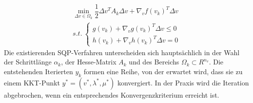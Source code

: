 \documentclass[12pt,a4paper]{article}
\begin{document}
  \begin{align*}
  \min_{\Delta v \in \Omega_{k}} \dfrac{1}{2} \Delta v^{T} A_{k} \Delta v + \nabla_{v} f(v_{k})^{T} \Delta v \\
  s.t. \ 
     \left\lbrace   \begin{array}{c} g(v_{k}) + \nabla_{v} g(v_{k})^{T} \Delta v \leq 0\\ h(v_{k}) + \nabla_{v} h(v_{k})^{T} \Delta v = 0 \end{array} \right.
  \end{align*}
  Die existierenden SQP-Verfahren unterscheiden sich hauptsächlich in der Wahl der Schrittlänge $ \alpha_{k} $, der Hesse-Matrix $ A_{k} $ und des Bereichs $ \Omega_{k}\subset R^{n_{v}} $. Die entstehenden Iterierten $ y_{k} $ formen eine Reihe, von der erwartet wird, dass sie zu einem KKT-Punkt $ y^{*} = (v^{*},\lambda^{*},\mu^{*} ) $ konvergiert. In der Praxis wird die Iteration abgebrochen, wenn ein entsprechendes Konvergenzkriterium erreicht ist.
  \\
  
\end{document}
